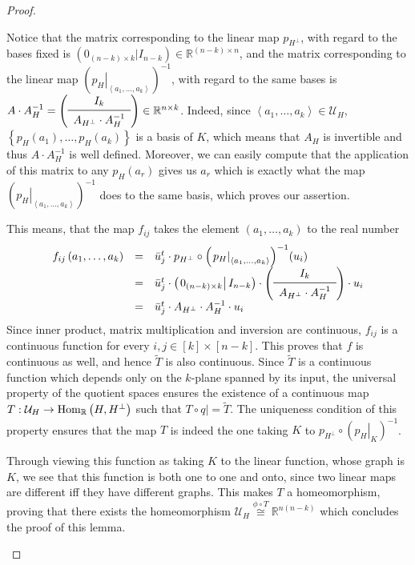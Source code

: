 \begin{proof}
\begin{b_item}
Notice that the matrix corresponding to the linear map $p_{H^{\perp}}$, with regard to the bases fixed is
$\left(0_{(n-k)\times k}|I_{n-k}\right)\in\mathbb{R}^{(n-k)\times n}$,
and the matrix corresponding to the linear map ${\left(\left.p_H\right|_{\left<a_1,\ldots,a_k\right>}\right)}^{-1}$, with regard to the same bases is
$A\cdot A_H^{-1}=\left(\begin{array}{c}
I_k\\
\midrule
A_{H^{\perp}}\cdot A_H^{-1}\\
\end{array}\right)
\in\mathbb{R}^{n\times{k}}$.
Indeed, since $\left<a_1,\ldots,a_k\right>\in\mathcal{U}_H$, $\left\{p_H(a_1),\ldots,p_H(a_k)\right\}$ is a basis of $K$, which means that $A_H$ is invertible and thus $A\cdot A_H^{-1}$ is well defined. Moreover, we can easily compute that the application of this matrix to any $p_H(a_r)$ gives us $a_r$ which is exactly what the map ${\left({\left.p_H\right|}_{\left<a_1,\ldots,a_k\right>}\right)}^{-1}$ does to the same basis, which proves our assertion.

This means, that the map $f_{ij}$ takes the element $\left(a_1,\ldots,a_k\right)$ to the real number
\[\begin{array}{rcl}f_{ij}\left(a_1,\ldots,a_k\right)
&=&\bar{u}_j^t\cdot p_{H^{\perp}}\circ{\left(\left.p_H\right|_{\left<a_1,\ldots,a_k\right>}\right)}^{-1}(u_i)\\
&=&\bar{u}_j^t\cdot\left(\left.0_{(n-k)\times k}\right|I_{n-k}\right)\cdot\left(\begin{array}{c}I_k\\\midrule A_{H^{\perp}}\cdot A_H^{-1}\\\end{array}\right)\cdot u_i\\
&=&\bar{u}_j^t\cdot A_{H^{\perp}}\cdot A_H^{-1}\cdot u_i\\
\end{array}\]
Since inner product, matrix multiplication and inversion are continuous, $f_{ij}$ is a continuous function for every $i,j\in[k]\times[n-k]$. This proves that $f$ is continuous as well, and hence $\tilde T$ is also continuous. Since $\tilde T$ is a continuous function which depends only on the $k$-plane spanned by its input, the universal property of the quotient spaces ensures the existence of a continuous map $T:\mathcal{U}_H\to\mathrm{Hom}_{\mathbb{R}}\left(H,H^{\perp}\right)$ such that $T\circ \left.q\right|=\tilde T$. The uniqueness condition of this property ensures that the map $T$ is indeed the one taking $K$ to $p_{H^{\perp}}\circ{\left(\left.p_H\right|_K\right)}^{-1}$.

Through viewing this function as taking $K$ to the linear function, whose graph is $K$, we see that this function is both one to one and onto, since two linear maps are different iff they have different graphs. This makes $T$ a homeomorphism, proving that there exists the homeomorphism
$\mathcal{U}_H\overset{\phi\circ T}{\cong}\mathbb{R}^{n(n-k)}$
which concludes the proof of this lemma.\qedhere
\end{b_item}
\end{proof}
